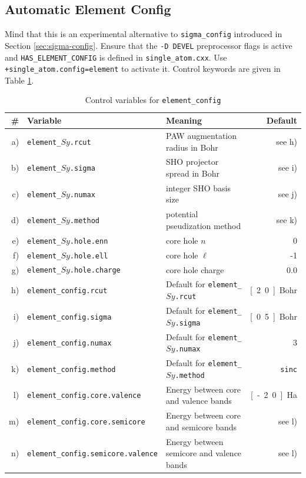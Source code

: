 \documentclass[oribibl]{llncs}
\newcommand{\ttt}[1]{\texttt{#1}}
\begin{document}
\subsection{Automatic Element Config} \label{sec:element-config}
%
Mind that this is an experimental alternative to \ttt{sigma\_config} 
introduced in Section \ref{sec:sigma-config}.
Ensure that the \ttt{-D DEVEL} preprocessor flags is active and
\ttt{HAS\_ELEMENT\_CONFIG} is defined in \ttt{single\_atom.cxx}.
Use \ttt{+single\_atom.config=element} to activate it.
Control keywords are given in Table \ref{tab:element-config-variables}.
%
\begin{table}[h]
\caption[Element Config Variables]{
Control variables for \ttt{element\_config}
} \label{tab:element-config-variables}
\centering
\begin{tabular}{|r|l|l|r|}
\hline
  \# & Variable & Meaning & Default \\
\hline
 a) & \ttt{element\_}$Sy$\ttt{.rcut}         & \ac{PAW} augmentation radius in Bohr         & see h) \\
 b) & \ttt{element\_}$Sy$\ttt{.sigma}        & \ac{SHO} projector spread in Bohr            & see i) \\
 c) & \ttt{element\_}$Sy$\ttt{.numax}        & integer \ac{SHO} basis size                  & see j) \\
 d) & \ttt{element\_}$Sy$\ttt{.method}       & potential pseudization method                & see k) \\
 e) & \ttt{element\_}$Sy$\ttt{.hole.enn}     & core hole $n$                                & 0 \\
 f) & \ttt{element\_}$Sy$\ttt{.hole.ell}     & core hole $\ell$                             & -1 \\
 g) & \ttt{element\_}$Sy$\ttt{.hole.charge}  & core hole charge                             & 0.0 \\
 h) & \ttt{element\_config.rcut}             & Default for \ttt{element\_}$Sy$\ttt{.rcut}   & \unit[2.0]{Bohr} \\
 i) & \ttt{element\_config.sigma}            & Default for \ttt{element\_}$Sy$\ttt{.sigma}  & \unit[0.5]{Bohr} \\
 j) & \ttt{element\_config.numax}            & Default for \ttt{element\_}$Sy$\ttt{.numax}  & 3 \\
 k) & \ttt{element\_config.method}           & Default for \ttt{element\_}$Sy$\ttt{.method} & \ttt{sinc} \\
 l) & \ttt{element\_config.core.valence}     & Energy between core and valence bands        & \unit[-2.0]{Ha} \\
 m) & \ttt{element\_config.core.semicore}    & Energy between core and semicore bands       & see l) \\
 n) & \ttt{element\_config.semicore.valence} & Energy between semicore and valence bands    & see l) \\
\hline
\end{tabular}
\end{table}
%
\end{document}
